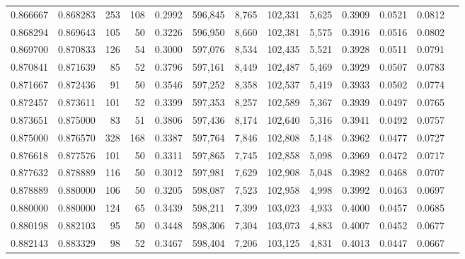 \begin{tabular}{rrrrrrrrrrrrr}
0.866667 & 0.868283 &    253 &   108 &                                     0.2992 & 596,845 &   8,765 & 102,331 &   5,625 & 0.3909 & 0.0521 & 0.0812 \\
0.868294 & 0.869643 &    105 &    50 &                                     0.3226 & 596,950 &   8,660 & 102,381 &   5,575 & 0.3916 & 0.0516 & 0.0802 \\
0.869700 & 0.870833 &    126 &    54 &                                     0.3000 & 597,076 &   8,534 & 102,435 &   5,521 & 0.3928 & 0.0511 & 0.0791 \\
0.870841 & 0.871639 &     85 &    52 &                                     0.3796 & 597,161 &   8,449 & 102,487 &   5,469 & 0.3929 & 0.0507 & 0.0783 \\
0.871667 & 0.872436 &     91 &    50 &                                     0.3546 & 597,252 &   8,358 & 102,537 &   5,419 & 0.3933 & 0.0502 & 0.0774 \\
0.872457 & 0.873611 &    101 &    52 &                                     0.3399 & 597,353 &   8,257 & 102,589 &   5,367 & 0.3939 & 0.0497 & 0.0765 \\
0.873651 & 0.875000 &     83 &    51 &                                     0.3806 & 597,436 &   8,174 & 102,640 &   5,316 & 0.3941 & 0.0492 & 0.0757 \\
0.875000 & 0.876570 &    328 &   168 &                                     0.3387 & 597,764 &   7,846 & 102,808 &   5,148 & 0.3962 & 0.0477 & 0.0727 \\
0.876618 & 0.877576 &    101 &    50 &                                     0.3311 & 597,865 &   7,745 & 102,858 &   5,098 & 0.3969 & 0.0472 & 0.0717 \\
0.877632 & 0.878889 &    116 &    50 &                                     0.3012 & 597,981 &   7,629 & 102,908 &   5,048 & 0.3982 & 0.0468 & 0.0707 \\
0.878889 & 0.880000 &    106 &    50 &                                     0.3205 & 598,087 &   7,523 & 102,958 &   4,998 & 0.3992 & 0.0463 & 0.0697 \\
0.880000 & 0.880000 &    124 &    65 &                                     0.3439 & 598,211 &   7,399 & 103,023 &   4,933 & 0.4000 & 0.0457 & 0.0685 \\
0.880198 & 0.882103 &     95 &    50 &                                     0.3448 & 598,306 &   7,304 & 103,073 &   4,883 & 0.4007 & 0.0452 & 0.0677 \\
0.882143 & 0.883329 &     98 &    52 &                                     0.3467 & 598,404 &   7,206 & 103,125 &   4,831 & 0.4013 & 0.0447 & 0.0667 \\

\end{tabular}
